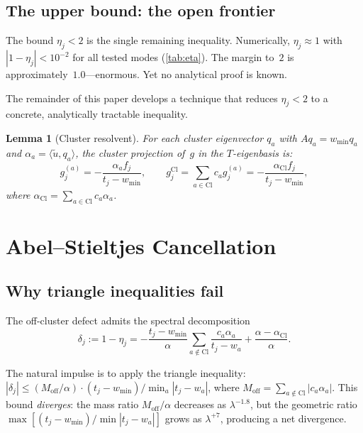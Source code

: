 \documentclass[12pt,a4paper]{article}
\newtheorem{lemma}[theorem]{Lemma}
\theoremstyle{definition}
\theoremstyle{remark}
\newcommand{\Cl}{\mathrm{Cl}}
\newcommand{\off}{\mathrm{off}}
\newcommand{\ip}[2]{\langle #1, #2 \rangle}
\newcommand{\utilde}{\tilde{u}}
\newcommand{\wmin}{w_{\min}}
\begin{document}
\subsection{The upper bound: the open frontier}

The bound $\eta_j < 2$ is the single remaining inequality.
Numerically, $\eta_j \approx 1$ with $|1 - \eta_j| < 10^{-2}$
for all tested modes (\cref{tab:eta}).
The margin to~$2$ is approximately~$1.0$---enormous.
Yet no analytical proof is known.

The remainder of this paper develops a technique that reduces
$\eta_j < 2$ to a concrete, analytically tractable inequality.

\begin{lemma}[Cluster resolvent]
\label{lem:cluster-resolvent}
For each cluster eigenvector $q_a$ with $A q_a = \wmin q_a$
and $\alpha_a = \ip{\utilde}{q_a}$, the cluster projection of~$g$
in the $T$-eigenbasis is:
\begin{equation}
g_j^{(a)} = -\frac{\alpha_a f_j}{t_j - \wmin},
\qquad
g_j^{\Cl} = \sum_{a \in \Cl} c_a g_j^{(a)}
= -\frac{\alpha_{\Cl} f_j}{t_j - \wmin},
\end{equation}
where $\alpha_{\Cl} = \sum_{a \in \Cl} c_a \alpha_a$.
\end{lemma}

\section{Abel--Stieltjes Cancellation}
\label{sec:abel}

\subsection{Why triangle inequalities fail}

The off-cluster defect admits the spectral decomposition
\begin{equation}
\label{eq:delta-cauchy}
\delta_j := 1 - \eta_j
= -\frac{t_j - \wmin}{\alpha}
\sum_{a \notin \Cl} \frac{c_a \alpha_a}{t_j - w_a}
+ \frac{\alpha - \alpha_{\Cl}}{\alpha}.
\end{equation}

The natural impulse is to apply the triangle inequality:
$|\delta_j| \leq (M_{\off}/\alpha) \cdot (t_j - \wmin) / \min_a |t_j - w_a|$,
where $M_{\off} = \sum_{a \notin \Cl} |c_a \alpha_a|$.
This bound \emph{diverges}: the mass ratio $M_{\off}/\alpha$ decreases as
$\lambda^{-1.8}$, but the geometric ratio $\max[(t_j-\wmin)/\min|t_j-w_a|]$
grows as $\lambda^{+7}$, producing a net divergence.
\end{document}

